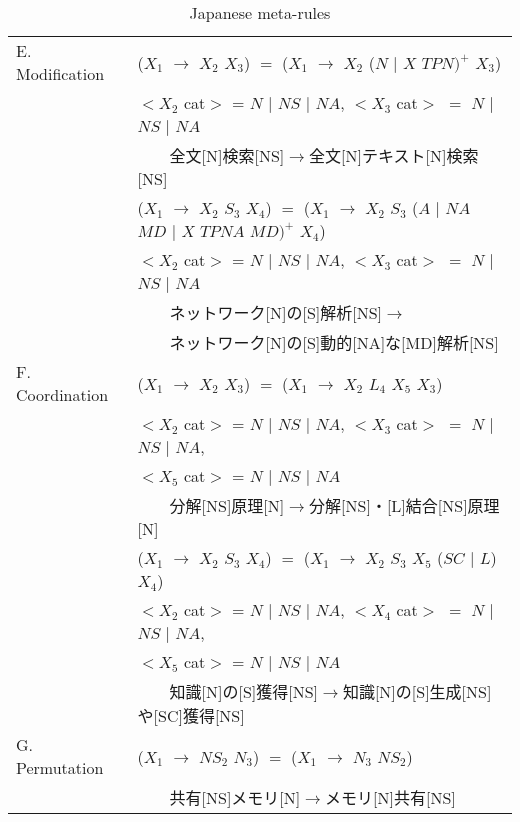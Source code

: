 \begin{table}
\begin{center}
{\begin{tabular}{ll}
E. Modification & ($X_1$ $\rightarrow$ $X_2$ $X_3$) $=$ ($X_1$ $\rightarrow$ $X_2$ ($N$ $|$ $X$ $TPN)^+$ $X_3$)\\
& $<X_2$ cat$>$ = $N$ $|$ $NS$ $|$ $NA$, \quad $<X_3$ cat$>$ $=$ $N$ $|$ $NS$ $|$ $NA$\\
& 　　全文[N]検索[NS]$\rightarrow$全文[N]テキスト[N]検索[NS]\\
& ($X_1$ $\rightarrow$ $X_2$ $S_3$ $X_4$) $=$ ($X_1$ $\rightarrow$ $X_2$ $S_3$ ($A$ $|$ $NA$ $MD$ $|$ $X$ $TPNA$ $MD)^+$ $X_4$)\\
& $<X_2$ cat$>$ = $N$ $|$ $NS$ $|$ $NA$, \quad $<X_3$ cat$>$ $=$ $N$ $|$ $NS$ $|$ $NA$\\
& 　　ネットワーク[N]の[S]解析[NS]$\rightarrow$\\
& 　　ネットワーク[N]の[S]動的[NA]な[MD]解析[NS]\\
\hline

F. Coordination & ($X_1$ $\rightarrow$ $X_2$ $X_3$) $=$ ($X_1$ $\rightarrow$ $X_2$ $L_4$ $X_5$ $X_3$)\\
& $<X_2$ cat$>$ = $N$ $|$ $NS$ $|$ $NA$, \quad $<X_3$ cat$>$ $=$ $N$ $|$ $NS$ $|$ $NA$,\\
& $<X_5$ cat$>$ = $N$ $|$ $NS$ $|$ $NA$\\
& 　　分解[NS]原理[N]$\rightarrow$分解[NS]・[L]結合[NS]原理[N]\\
& ($X_1$ $\rightarrow$ $X_2$ $S_3$ $X_4$) $=$ ($X_1$ $\rightarrow$ $X_2$ $S_3$ $X_5$ ($SC$ $|$ $L$) $X_4$)\\
& $<X_2$ cat$>$ = $N$ $|$ $NS$ $|$ $NA$, \quad $<X_4$ cat$>$ $=$ $N$ $|$ $NS$ $|$ $NA$,\\
& $<X_5$ cat$>$ = $N$ $|$ $NS$ $|$ $NA$\\
& 　　知識[N]の[S]獲得[NS]$\rightarrow$知識[N]の[S]生成[NS]や[SC]獲得[NS]\\
\hline

G. Permutation & ($X_1$ $\rightarrow$ $NS_2$ $N_3$) $=$ ($X_1$ $\rightarrow$ $N_3$ $NS_2$)\\
& 　　共有[NS]メモリ[N]$\rightarrow$メモリ[N]共有[NS]\\
\hline
\end{tabular}
}
\end{center}
\caption{Japanese meta-rules}
\end{table}

